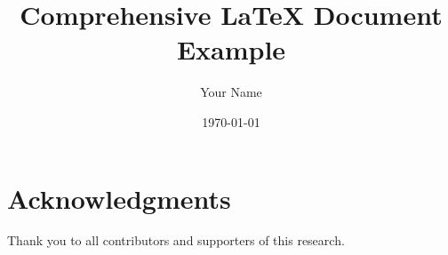 \documentclass[12pt, a4paper]{article}
\title{Comprehensive LaTeX Document Example}
\author{Your Name}
\date{\today}
\begin{document}
\maketitle



\tableofcontents
\newpage







\section*{Acknowledgments}
Thank you to all contributors and supporters of this research.

\printbibliography
\end{document}
